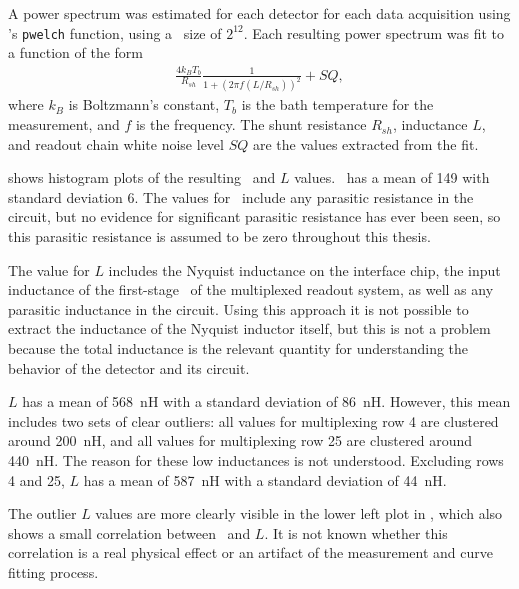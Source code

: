 A power spectrum was estimated for each detector for each data acquisition using \MATLAB's \texttt{pwelch} function, using a \FFT\ size of $2^{12}$.
Each resulting power spectrum was fit to a function of the form
\begin{eqnarray}\label{eqn:scnoise-fit}
	\frac{4 k_B T_b}{R_{sh}} \frac{1}{1 + (2 \pi f (L/R_{sh}))^2} + SQ,
\end{eqnarray}
where $k_B$ is Boltzmann's constant, $T_b$ is the bath temperature for the measurement, and $f$ is the frequency.
The shunt resistance $R_{sh}$, inductance $L$, and readout chain white noise level $SQ$ are the values extracted from the fit.

 shows histogram plots of the resulting \Rsh\ and $L$ values.
\Rsh\ has a mean of \SI{149}{\uOhm} with standard deviation \SI{6}{\uOhm}.
The values for \Rsh\ include any parasitic resistance in the circuit, but no evidence for significant parasitic resistance has ever been seen, so this parasitic resistance is assumed to be zero throughout this thesis.

The value for $L$ includes the Nyquist inductance on the interface chip, the input inductance of the first-stage \SQUID\ of the multiplexed readout system, as well as any parasitic inductance in the circuit.
Using this approach it is not possible to extract the inductance of the Nyquist inductor itself, but this is not a problem because the total inductance is the relevant  quantity for understanding the behavior of the detector and its circuit.

$L$ has a mean of 568~nH with a standard deviation of 86~nH.
However, this mean includes two sets of clear outliers: all values for multiplexing row 4 are clustered around 200~nH, and all values for multiplexing row 25 are clustered around 440~nH.
The reason for these low inductances is not understood.
Excluding rows 4 and 25,  $L$ has a mean of 587~nH with a standard deviation of 44~nH.

The outlier $L$ values are more clearly visible in the lower left plot in , which also shows a small correlation between \Rsh\ and $L$.
It is not known whether this correlation is a real physical effect or an artifact of the measurement and curve fitting process.

